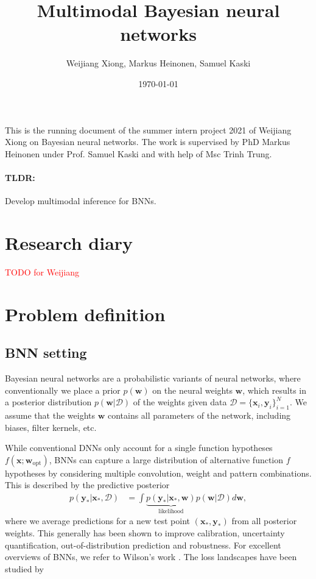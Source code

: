 \documentclass{article}
\title{Multimodal Bayesian neural networks}
\author{Weijiang Xiong, Markus Heinonen, Samuel Kaski}
\date{\today}
\def\x{\mathbf{x}}
\def\D{\mathcal{D}}
\def\w{\mathbf{w}}
\def\y{\mathbf{y}}
\newcommand{\red}[1]{\textcolor{red}{#1}}
\begin{document}
\maketitle

This is the running document of the summer intern project 2021 of Weijiang Xiong on Bayesian neural networks. The work is supervised by PhD Markus Heinonen under Prof. Samuel Kaski and with help of Msc Trinh Trung. 

\paragraph{TLDR:}
Develop multimodal inference for BNNs.

\section{Research diary}

\red{TODO for Weijiang}

\section{Problem definition}

\subsection{BNN setting}

Bayesian neural networks are a probabilistic variants of neural networks, where conventionally we place a prior $p(\w)$ on the neural weights $\w$, which results in a posterior distribution $p(\w|\D)$ of the weights given data $\D = \{\x_i,\y_i\}_{i=1}^N$. We assume that the weights $\w$ contains all parameters of the network, including biases, filter kernels, etc. 

While conventional DNNs only account for a single function hypotheses $f(\x ; \w_{\text{opt}})$, BNNs can capture a large distribution of alternative function $f$ hypotheses by considering multiple convolution, weight and pattern combinations. This is described by the predictive posterior
\begin{align}
    p(\y_* | \x_*, \D) &= \int \underbrace{p(\y_* | \x_*, \w)}_{\text{likelihood}} p(\w | \D) d\w,
\end{align}
where we average predictions for a new test point $(\x_*,\y_*)$ from all posterior weights. This generally has been shown to improve calibration, uncertainty quantification, out-of-distribution prediction and robustness. For excellent overviews of BNNs, we refer to Wilson's work \citep{wilson2020,wilson2020b}. The loss landscapes have been studied by \citet{garipov18}
\end{document}
